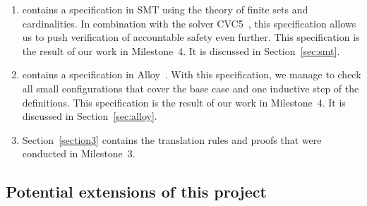 \begin{enumerate}
    \item \SpecThreeB{} contains a specification in SMT using the theory of
        finite sets and cardinalities. In combination with the solver
        CVC5~\cite{BarbosaBBKLMMMN22}, this specification allows us to push
        verification of accountable safety even further. This specification is
        the result of our work in Milestone~4. It is discussed in
        Section~\ref{sec:smt}.

    \item \SpecThreeC{} contains a specification in
        Alloy~\cite{jackson2012software,alloytools}. With this specification,
        we manage to check all small configurations that cover the base case
        and one inductive step of the definitions. This specification is the
        result of our work in Milestone~4. It is discussed in
        Section~\ref{sec:alloy}.

    \item Section~\ref{section3} contains the translation rules and proofs
        that were conducted in Milestone~3.

\end{enumerate}

\subsection{Potential extensions of this project}\label{sec:future}



